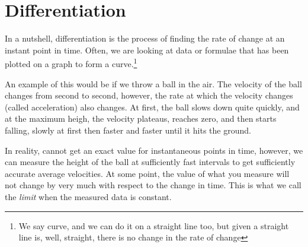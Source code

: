 \chapter{Differentiation}
\label{chap:Differentiation}
In a nutshell, differentiation is the process of finding the rate of change at
an instant point in time. Often, we are looking at data or formulae that has
been plotted on a graph to form a curve.\footnote{We say curve, and we can do it
on a straight line too, but given a straight line is, well, straight, there is
no change in the rate of change}

An example of this would be if we throw a ball in the air. The velocity of the
ball changes from second to second, however, the rate at which the velocity
changes (called acceleration) also changes. At first, the ball slows down quite
quickly, and at the maximum heigh, the velocity plateaus, reaches zero, and then
starts falling, slowly at first then faster and faster until it hits the ground.

In reality, cannot get an exact value for instantaneous points in time, however,
we can measure the height of the ball at sufficiently fast intervals to
get sufficiently accurate average velocities. At some point, the value of what
you measure will not change by very much with respect to the change in time.
This is what we call the \emph{limit} when the measured data is constant.

